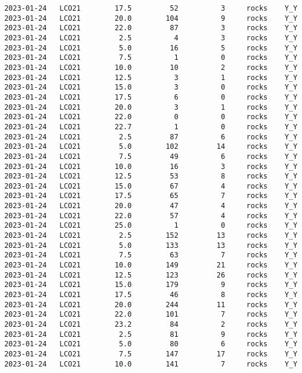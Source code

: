 \documentclass[
]{article}
\begin{document}
\begin{verbatim}
 2023-01-24   LCO21        17.5         52          3     rocks    Y_Y
 2023-01-24   LCO21        20.0        104          9     rocks    Y_Y
 2023-01-24   LCO21        22.0         87          3     rocks    Y_Y
 2023-01-24   LCO21         2.5          4          3     rocks    Y_Y
 2023-01-24   LCO21         5.0         16          5     rocks    Y_Y
 2023-01-24   LCO21         7.5          1          0     rocks    Y_Y
 2023-01-24   LCO21        10.0         10          2     rocks    Y_Y
 2023-01-24   LCO21        12.5          3          1     rocks    Y_Y
 2023-01-24   LCO21        15.0          3          0     rocks    Y_Y
 2023-01-24   LCO21        17.5          6          0     rocks    Y_Y
 2023-01-24   LCO21        20.0          3          1     rocks    Y_Y
 2023-01-24   LCO21        22.0          0          0     rocks    Y_Y
 2023-01-24   LCO21        22.7          1          0     rocks    Y_Y
 2023-01-24   LCO21         2.5         87          6     rocks    Y_Y
 2023-01-24   LCO21         5.0        102         14     rocks    Y_Y
 2023-01-24   LCO21         7.5         49          6     rocks    Y_Y
 2023-01-24   LCO21        10.0         16          3     rocks    Y_Y
 2023-01-24   LCO21        12.5         53          8     rocks    Y_Y
 2023-01-24   LCO21        15.0         67          4     rocks    Y_Y
 2023-01-24   LCO21        17.5         65          7     rocks    Y_Y
 2023-01-24   LCO21        20.0         47          4     rocks    Y_Y
 2023-01-24   LCO21        22.0         57          4     rocks    Y_Y
 2023-01-24   LCO21        25.0          1          0     rocks    Y_Y
 2023-01-24   LCO21         2.5        152         13     rocks    Y_Y
 2023-01-24   LCO21         5.0        133         13     rocks    Y_Y
 2023-01-24   LCO21         7.5         63          7     rocks    Y_Y
 2023-01-24   LCO21        10.0        149         21     rocks    Y_Y
 2023-01-24   LCO21        12.5        123         26     rocks    Y_Y
 2023-01-24   LCO21        15.0        179          9     rocks    Y_Y
 2023-01-24   LCO21        17.5         46          8     rocks    Y_Y
 2023-01-24   LCO21        20.0        244         11     rocks    Y_Y
 2023-01-24   LCO21        22.0        101          7     rocks    Y_Y
 2023-01-24   LCO21        23.2         84          2     rocks    Y_Y
 2023-01-24   LCO21         2.5         81          9     rocks    Y_Y
 2023-01-24   LCO21         5.0         80          6     rocks    Y_Y
 2023-01-24   LCO21         7.5        147         17     rocks    Y_Y
 2023-01-24   LCO21        10.0        141          7     rocks    Y_Y

\end{verbatim}
\end{document}
